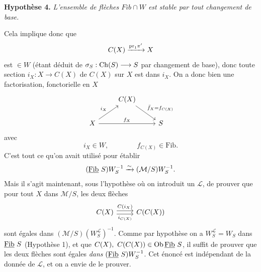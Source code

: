 \textbf{Hypothèse 4.} \textit{L'ensemble de flèches $\mathit{Fib}\cap W$ est stable par tout changement de base.}



Cela implique donc que
\[
C(X)\xrightarrow{\mathrm{pr}_1\pi'}X
\]
 est $\in W$ (étant déduit de $\sigma_S : \mathrm{Ch}(S)\longrightarrow S$ par changement de base), donc toute section $i_X : X\longrightarrow C(X)$ de $C(X)$ sur $X$ est dans $i_X$. On a donc bien une factorisation, fonctorielle en $X$
\[
\begin{tikzcd}
 & C(X) \arrow[dr, "\bar f_X=f_{C(X)}"] & \\
X \arrow[ur, "i_X"] \arrow[rr, "f_X"] & & S
\end{tikzcd}
\]
avec
\[
i_X\in W,\qquad\qquad f_{C(X)}\in\mathrm{Fib}.
\]
C'est tout ce qu'on avait utilisé pour établir
\[
(\underline{\mathrm{Fib}}\,\,S)W_S^{-1}\xrightarrow{\sim}(\mathcal{M}/S)W_S^{-1}.
\]
Mais il s'agit maintenant, sous l'hypothèse où on introduit un $\mathcal{L}$, de prouver que pour tout $X$ dans $\mathcal{M}/S$, les deux flèches
\[
\begin{tikzcd}
C(X) \arrow[r, shift left, "C(i_X)"] \arrow[r, shift right, "i_{C(X)}"'] & C(C(X))
\end{tikzcd}
\]
sont égales dans $(\mathcal{M}/S)(W_S^{\mathcal{L}})^{-1}$. Comme par hypothèse on a $W_S^{\mathcal{L}}=W_S$ dans $\underline{\mathrm{Fib}}\,\,S$ (Hypothèse 1), et que $C(X),\ C(C(X))\in\mathrm{Ob}\,\Fib\,S$,
il suffit de prouver que les deux flèches sont égales \textit{dans} $(\underline{\mathrm{Fib}}\,\,S)W_S^{-1}$. Cet énoncé est indépendant de la donnée de $\mathcal{L}$, et on a envie de le prouver.

